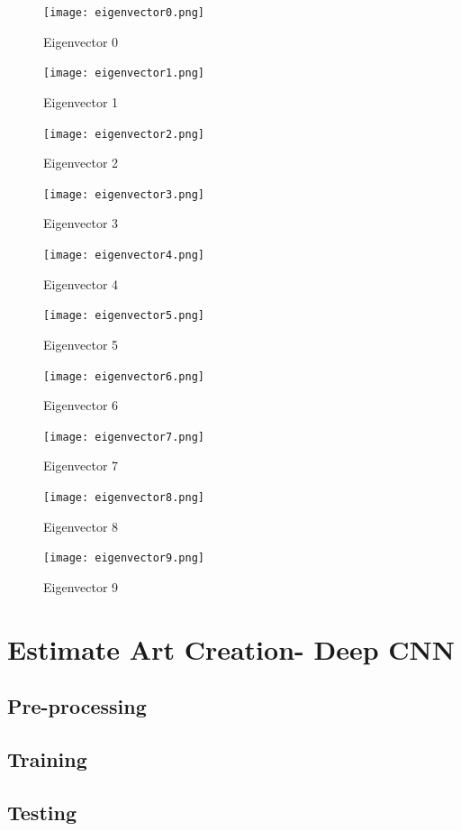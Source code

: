 \documentclass{article}
\begin{document}
\begin{figure}[!htb]
   \begin{minipage}{0.48\textwidth}
     \centering
      \texttt{[image: eigenvector0.png]}
    \caption{Eigenvector 0}
   \end{minipage}\hfill
   \begin{minipage}{0.48\textwidth}
     \centering
     \texttt{[image: eigenvector1.png]}
     \caption{Eigenvector 1}
   \end{minipage}
   \begin{minipage}{0.48\textwidth}
     \centering
     \texttt{[image: eigenvector2.png]}
     \caption{Eigenvector 2}
   \end{minipage}
   \begin{minipage}{0.48\textwidth}
     \centering
     \texttt{[image: eigenvector3.png]}
     \caption{Eigenvector 3}
   \end{minipage}
   \begin{minipage}{0.48\textwidth}
     \centering
     \texttt{[image: eigenvector4.png]}
     \caption{Eigenvector 4}
   \end{minipage}
      \begin{minipage}{0.48\textwidth}
     \centering
     \texttt{[image: eigenvector5.png]}
     \caption{Eigenvector 5}
   \end{minipage}
      \begin{minipage}{0.48\textwidth}
     \centering
     \texttt{[image: eigenvector6.png]}
     \caption{Eigenvector 6}
   \end{minipage}
      \begin{minipage}{0.48\textwidth}
     \centering
     \texttt{[image: eigenvector7.png]}
     \caption{Eigenvector 7}
   \end{minipage}
      \begin{minipage}{0.48\textwidth}
     \centering
     \texttt{[image: eigenvector8.png]}
     \caption{Eigenvector 8}
   \end{minipage}
      \begin{minipage}{0.48\textwidth}
     \centering
     \texttt{[image: eigenvector9.png]}
     \caption{Eigenvector 9}
   \end{minipage}
\end{figure}

\newpage
\section{Estimate Art Creation- Deep CNN}
\subsection{Pre-processing}
\subsection{Training}
\subsection{Testing}
\end{document}
